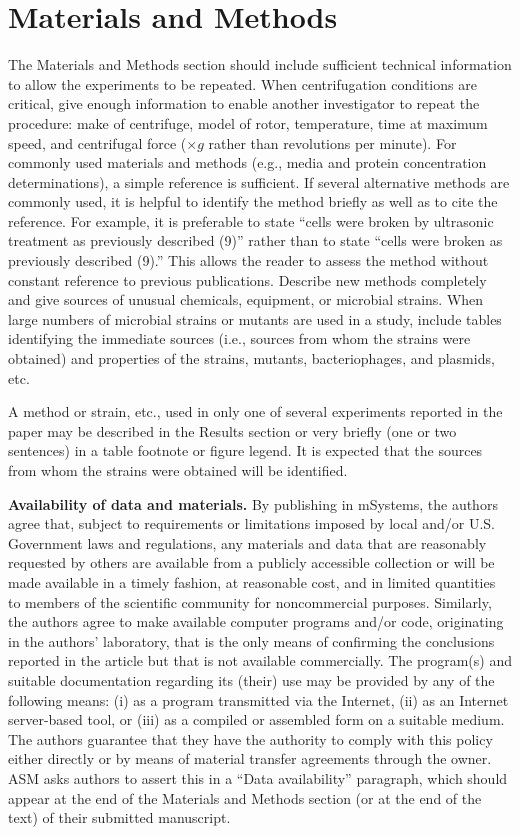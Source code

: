 \documentclass[lineno]{asm-article}
\begin{document}
\section{Materials and Methods}
The Materials and Methods section should include sufficient technical information to allow the experiments to be repeated. When centrifugation conditions are critical, give enough information to enable another investigator to repeat the  procedure: make of centrifuge, model of rotor, temperature, time at maximum  speed, and centrifugal force ($\times g$ rather than revolutions per minute). For commonly used materials and methods (e.g., media and protein concentration determinations), a simple reference is sufficient. If several alternative methods are commonly used, it is helpful to identify the method briefly as well as to  cite the reference. For example, it is preferable to state ``cells were broken by ultrasonic treatment as previously described (9)'' rather than to state ``cells were broken as previously described (9).'' This allows the reader to assess the method without constant reference  to  previous  publications. Describe  new  methods completely and give sources of unusual chemicals, equipment, or microbial strains. When large numbers of microbial strains or mutants are used in a study, include tables identifying the immediate sources (i.e., sources from whom the strains were obtained)  and  properties  of  the  strains,  mutants,  bacteriophages, and plasmids, etc.

A method or strain, etc., used in only one of several experiments reported in the paper may be described in the Results section or very briefly (one or two sentences) in a table footnote or figure legend. It is expected that the sources from whom the strains were obtained will be identified.

\textbf{Availability of data and materials.} By publishing in mSystems, the authors agree that, subject to requirements or limitations imposed by local and/or U.S. Government laws and regulations, any materials and data that are reasonably requested by others are available from a publicly accessible collection or will be made available in a timely fashion, at reasonable cost, and in limited quantities to members of the scientific community for noncommercial purposes. Similarly, the authors agree to make available computer programs and/or code, originating in the authors’ laboratory, that is the only means of confirming the conclusions reported in the article but that is not available commercially. The program(s) and suitable documentation regarding its (their) use may be provided by any of the following means: (i) as a program transmitted via the Internet, (ii) as an Internet server-based tool, or (iii) as a compiled or assembled form on a suitable medium. The authors guarantee that they have the authority to comply with this policy either directly or by means of material transfer agreements through the owner. ASM asks authors to assert this in a “Data availability” paragraph, which should appear at the end of the Materials and Methods section (or at the end of the text) of their submitted manuscript.
\end{document}
